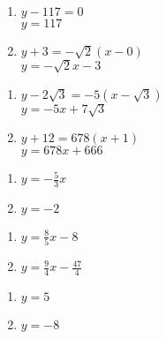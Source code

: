 \begin{multicols}{2}
\begin{enumerate}
\setcounter{enumi}{\value{HW}}

\item $y - 117 = 0$ \\ $y = 117$
\item $y + 3 = -\sqrt{2}(x - 0)$ \\ $y = -\sqrt{2}x - 3$

\setcounter{HW}{\value{enumi}}
\end{enumerate}
\end{multicols}



\begin{multicols}{2}
\begin{enumerate}
\setcounter{enumi}{\value{HW}}

\item $y - 2\sqrt{3} = -5(x - \sqrt{3})$ \\ $y = -5x + 7\sqrt{3}$ 
\item $y + 12 = 678(x + 1)$ \\ $y = 678x + 666$

\setcounter{HW}{\value{enumi}}
\end{enumerate}
\end{multicols}


\begin{multicols}{2}
\begin{enumerate}
\setcounter{enumi}{\value{HW}}

\item $y = -\frac{5}{3}x$
\item $y = -2$

\setcounter{HW}{\value{enumi}}
\end{enumerate}
\end{multicols}


\begin{multicols}{2}
\begin{enumerate}
\setcounter{enumi}{\value{HW}}

\item $y = \frac{8}{5}x - 8$ 
\item $y = \frac{9}{4}x - \frac{47}{4}$

\setcounter{HW}{\value{enumi}}
\end{enumerate}
\end{multicols}


\begin{multicols}{2}
\begin{enumerate}
\setcounter{enumi}{\value{HW}}

\item $y = 5$
\item $y = -8$

\setcounter{HW}{\value{enumi}}
\end{enumerate}
\end{multicols}

